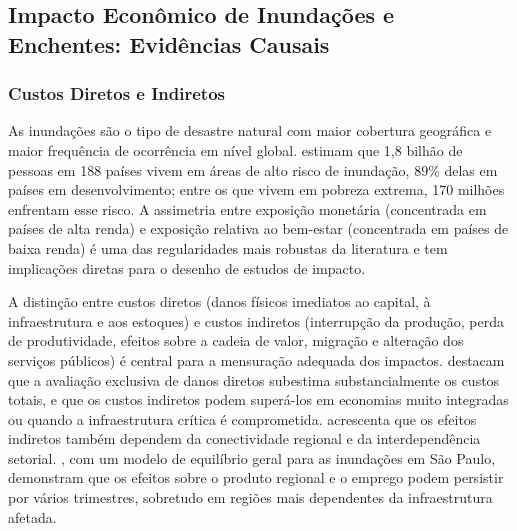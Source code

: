 \documentclass[a4paper,12pt]{article}
\begin{document}
\subsection{Impacto Econômico de Inundações e Enchentes: Evidências Causais}
\label{sub:impacto}

\subsubsection{Custos Diretos e Indiretos}

As inundações são o tipo de desastre natural com maior cobertura geográfica e maior
frequência de ocorrência em nível global.  estimam que 1,8
bilhão de pessoas em 188 países vivem em áreas de alto risco de inundação, 89\% delas
em países em desenvolvimento; entre os que vivem em pobreza extrema, 170 milhões
enfrentam esse risco. A assimetria entre exposição monetária (concentrada em países de
alta renda) e exposição relativa ao bem-estar (concentrada em países de baixa renda)
é uma das regularidades mais robustas da literatura \cite{mcdermott2022} e tem
implicações diretas para o desenho de estudos de impacto.

A distinção entre custos diretos (danos físicos imediatos ao capital, à infraestrutura e
aos estoques) e custos indiretos (interrupção da produção, perda de produtividade, efeitos
sobre a cadeia de valor, migração e alteração dos serviços públicos) é central para a
mensuração adequada dos impactos.  destacam que a avaliação
exclusiva de danos diretos subestima substancialmente os custos totais, e que os custos
indiretos podem superá-los em economias muito integradas ou quando a infraestrutura
crítica é comprometida.  acrescenta que os efeitos indiretos
também dependem da conectividade regional e da interdependência setorial.
, com um modelo de equilíbrio geral para as inundações
em São Paulo, demonstram que os efeitos sobre o produto regional e o emprego podem
persistir por vários trimestres, sobretudo em regiões mais dependentes da infraestrutura
afetada.
\end{document}
